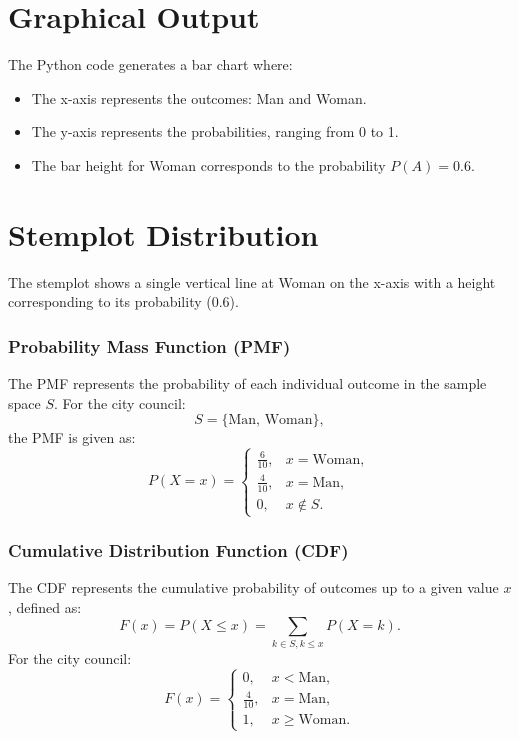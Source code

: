 \documentclass[journal]{IEEEtran}
\begin{document}
\section*{Graphical Output}
The Python code generates a bar chart where:
\begin{itemize}
    \item The x-axis represents the outcomes: Man and Woman.
    \item The y-axis represents the probabilities, ranging from 0 to 1.
    \item The bar height for Woman corresponds to the probability $P(A) = 0.6$.
\end{itemize}

\section*{Stemplot Distribution}
The stemplot shows a single vertical line at Woman on the x-axis with a height corresponding to its probability (0.6).
\subsubsection*{Probability Mass Function (PMF)}
The PMF represents the probability of each individual outcome in the sample space \( S \). For the city council:
\[
S = \{\text{Man, Woman}\},
\]
the PMF is given as:
\[
P(X = x) = 
\begin{cases} 
\frac{6}{10}, & x = \text{Woman}, \\ 
\frac{4}{10}, & x = \text{Man}, \\ 
0, & x \notin S.
\end{cases}
\]

\subsubsection*{Cumulative Distribution Function (CDF)}
The CDF represents the cumulative probability of outcomes up to a given value \( x \), defined as:
\[
F(x) = P(X \leq x) = \sum_{k \in S, k \leq x} P(X = k).
\]
For the city council:
\[
F(x) = 
\begin{cases} 
0, & x < \text{Man}, \\ 
\frac{4}{10}, & x = \text{Man}, \\ 
1, & x \geq \text{Woman}.
\end{cases}
\]
\end{document}
